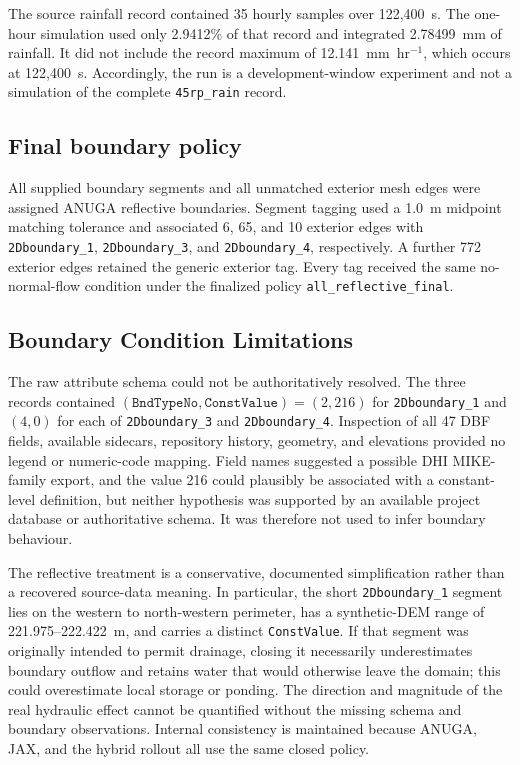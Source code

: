The source rainfall record contained 35 hourly samples over 122,400~s.  The
one-hour simulation used only 2.9412\% of that record and integrated
2.78499~mm of rainfall.  It did not include the record maximum of
12.141~mm~hr\(^{-1}\), which occurs at 122,400~s.  Accordingly, the run is a
development-window experiment and not a simulation of the complete
\texttt{45rp\_rain} record.

\subsection{Final boundary policy}

All supplied boundary segments and all unmatched exterior mesh edges were
assigned ANUGA reflective boundaries.  Segment tagging used a 1.0~m midpoint
matching tolerance and associated 6, 65, and 10 exterior edges with
\texttt{2Dboundary\_1}, \texttt{2Dboundary\_3}, and
\texttt{2Dboundary\_4}, respectively.  A further 772 exterior edges retained
the generic exterior tag.  Every tag received the same no-normal-flow
condition under the finalized policy
\texttt{all\_reflective\_final}.

\subsection{Boundary Condition Limitations}

The raw attribute schema could not be authoritatively resolved.  The three
records contained
\((\texttt{BndTypeNo},\texttt{ConstValue})=(2,216)\) for
\texttt{2Dboundary\_1} and \((4,0)\) for each of
\texttt{2Dboundary\_3} and \texttt{2Dboundary\_4}.  Inspection of all 47 DBF
fields, available sidecars, repository history, geometry, and elevations
provided no legend or numeric-code mapping.  Field names suggested a possible
DHI MIKE-family export, and the value 216 could plausibly be associated with a
constant-level definition, but neither hypothesis was supported by an
available project database or authoritative schema.  It was therefore not
used to infer boundary behaviour.

The reflective treatment is a conservative, documented simplification rather
than a recovered source-data meaning.  In particular, the short
\texttt{2Dboundary\_1} segment lies on the western to north-western perimeter,
has a synthetic-DEM range of 221.975--222.422~m, and carries a distinct
\texttt{ConstValue}.  If that segment was originally intended to permit
drainage, closing it necessarily underestimates boundary outflow and retains
water that would otherwise leave the domain; this could overestimate local
storage or ponding.  The direction and magnitude of the real hydraulic effect
cannot be quantified without the missing schema and boundary observations.
Internal consistency is maintained because ANUGA, JAX, and the hybrid rollout
all use the same closed policy.

